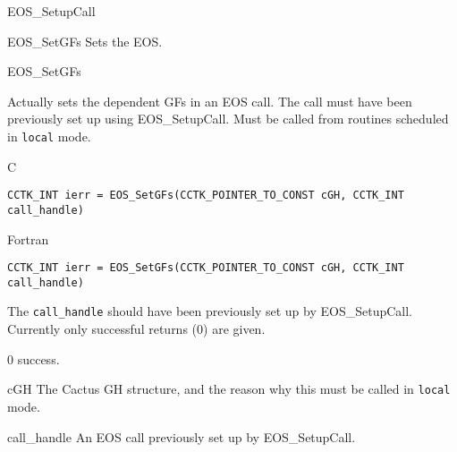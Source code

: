 \begin{FunctionDescription}{EOS\_SetupCall}
  \begin{SeeAlsoSection}
    \begin{SeeAlso}{EOS\_SetGFs}
      Sets the EOS.
    \end{SeeAlso}
  \end{SeeAlsoSection}
\end{FunctionDescription}



\begin{FunctionDescription}{EOS\_SetGFs}
  \label{Whisky_Dev_EOSBase_General_EOS_SetGFs}  
  
  Actually sets the dependent GFs in an EOS call. The call must have
  been previously set up using EOS\_SetupCall. Must be called from
  routines scheduled in {\tt local} mode.

  \begin{SynopsisSection}
    \begin{Synopsis}{C}
\begin{verbatim}
CCTK_INT ierr = EOS_SetGFs(CCTK_POINTER_TO_CONST cGH, CCTK_INT call_handle)
\end{verbatim}
    \end{Synopsis}
    \begin{Synopsis}{Fortran}
\begin{verbatim}
CCTK_INT ierr = EOS_SetGFs(CCTK_POINTER_TO_CONST cGH, CCTK_INT call_handle)
\end{verbatim}
    \end{Synopsis}
  \end{SynopsisSection}

  \begin{ResultSection}
    \begin{ResultNote}
      The {\tt call\_handle} should have been previously set up by
      EOS\_SetupCall. Currently only successful returns (0) are
      given.
    \end{ResultNote}
    \begin{Result}{\rm 0}
      success.
    \end{Result}
  \end{ResultSection}

  \begin{ParameterSection}
    \begin{Parameter}{cGH}
      The Cactus GH structure, and the reason why this must be called
      in {\tt local} mode.
    \end{Parameter}
    \begin{Parameter}{call\_handle}
      An EOS call previously set up by EOS\_SetupCall.
    \end{Parameter}
  \end{ParameterSection}


\end{FunctionDescription}
